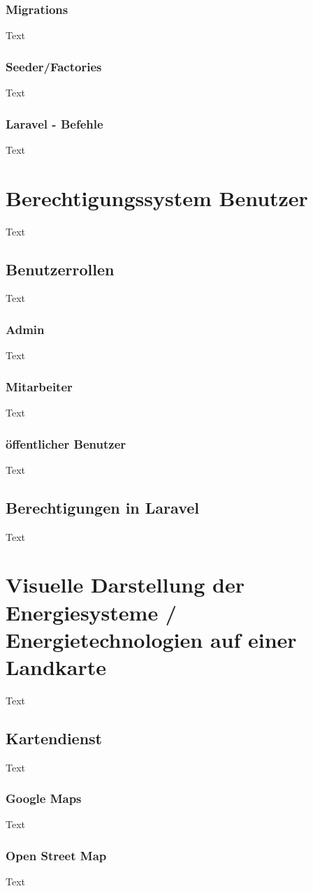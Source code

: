 \subsubsection{Migrations}
Text
\subsubsection{Seeder/Factories}
Text
\subsubsection{Laravel - Befehle}
Text


\section{Berechtigungssystem Benutzer}
Text
\subsection{Benutzerrollen }
Text
\subsubsection{Admin}
Text
\subsubsection{Mitarbeiter}
Text
\subsubsection{öffentlicher Benutzer}
Text
\subsection{Berechtigungen in Laravel}
Text



\section{Visuelle Darstellung der Energiesysteme / Energietechnologien auf einer Landkarte}
Text
\subsection{Kartendienst}
Text
\subsubsection{Google Maps}
Text
\subsubsection{Open Street Map}
Text
